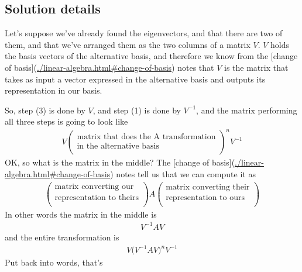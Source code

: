 \subsection*{Solution details}

Let's suppose we've already found the eigenvectors, and that there are two of
them, and that we've arranged them as the two columns of a matrix $V$. $V$ holds
the basis vectors of the alternative basis, and therefore we know from the
[change of basis](\url{./linear-algebra.html#change-of-basis}) notes that $V$ is the
matrix that takes as input a vector expressed in the alternative basis and
outputs its representation in our basis.

So, step (3) is done by $V$, and step (1) is done by $V^{-1}$, and the matrix
performing all three steps is going to look like
\begin{align*}
  V
  \begin{pmatrix}\text{matrix that does the A transformation}\\\text{in the alternative basis} \\ \end{pmatrix}^n
  V^{-1}
\end{align*}
OK, so what is the matrix in the middle? The [change of
basis](\url{./linear-algebra.html#change-of-basis}) notes tell us that we can compute it as
\begin{align*}
  \begin{pmatrix}\text{matrix converting our}\\\text{representation to theirs} \\ \end{pmatrix}
  A
  \begin{pmatrix}\text{matrix converting their}\\\text{representation to ours} \\ \end{pmatrix}
\end{align*}
In other words the matrix in the middle is
\begin{align*}
  V^{-1}AV
\end{align*}
and the entire transformation is
\begin{align*}
  V
  \Big(V^{-1}AV\Big)^n
  V^{-1}
\end{align*}
Put back into words, that's
